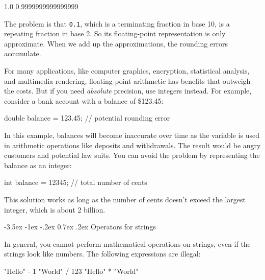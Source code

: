 \documentclass[12pt]{book}
\makeatletter
\theoremstyle{exercise}
\newcommand{\java}[1]{\verb"#1"}
\renewcommand{\section}{\@startsection{section}{1}{\z@}%
    {-3.5ex \@plus -1ex \@minus -.2ex}%
    {0.7ex \@plus.2ex}%
    {\normalfont\Large\bfseries}}
\newcommand{\java}[1]{\lstinline{#1}} %
\makeatother
\begin{document}
\begin{stdout}
1.0
0.9999999999999999
\end{stdout}

The problem is that \java{0.1}, which is a terminating fraction in base 10, is a repeating fraction in base 2.
So its floating-point representation is only approximate.
When we add up the approximations, the rounding errors accumulate.

For many applications, like computer graphics, encryption, statistical analysis, and multimedia rendering, floating-point arithmetic has benefits that outweigh the costs.
But if you need {\em absolute} precision, use integers instead.
For example, consider a bank account with a balance of \$123.45:

\begin{code}
    double balance = 123.45;  // potential rounding error
\end{code}

In this example, balances will become inaccurate over time as the variable is used in arithmetic operations like deposits and withdrawals.
The result would be angry customers and potential law suits.
You can avoid the problem by representing the balance as an integer:

\begin{code}
    int balance = 12345;      // total number of cents
\end{code}


This solution works as long as the number of cents doesn't exceed the largest integer, which is about 2 billion.


\section{Operators for strings}


In general, you cannot perform mathematical operations on strings, even if the strings look like numbers.
The following expressions are illegal:

\begin{code}
    "Hello" - 1     "World" / 123     "Hello" * "World"
\end{code}

\end{document}
